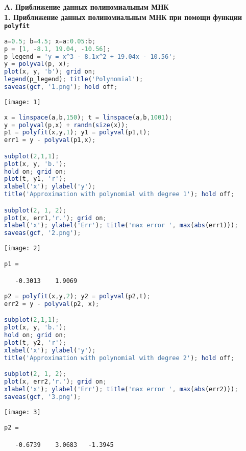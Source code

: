\documentclass[a4paper]{article}
\begin{document}

\newpage
{}
\setcounter{page}{2}

{\Large{\textbf{A. Приближение данных полиномиальным МНК}}}\\
{\textbf{1. Приближение данных полиномиальным МНК при помощи функции \texttt{polyfit}}}
\begin{lstlisting}[language=Octave]
a=0.5; b=4.5; x=a:0.05:b;
p = [1, -8.1, 19.04, -10.56];
p_legend = 'y = x^3 - 8.1x^2 + 19.04x - 10.56';
y = polyval(p, x);
plot(x, y, 'b'); grid on;
legend(p_legend); title('Polynomial');
saveas(gcf, '1.png'); hold off;
\end{lstlisting}
\begin{center}
    \texttt{[image: 1]}
\end{center}

\newpage
\begin{lstlisting}[language=Octave, firstnumber=8]
x = linspace(a,b,150); t = linspace(a,b,1001);
y = polyval(p,x) + randn(size(x));
p1 = polyfit(x,y,1); y1 = polyval(p1,t);
err1 = y - polyval(p1,x);

subplot(2,1,1);
plot(x, y, 'b.');
hold on; grid on;
plot(t, y1, 'r');
xlabel('x'); ylabel('y');
title('Approximation with polynomial with degree 1'); hold off;

subplot(2, 1, 2);
plot(x, err1,'r.'); grid on;
xlabel('x'); ylabel('Err'); title('max error ', max(abs(err1)));
saveas(gcf, '2.png');
\end{lstlisting}
\begin{center}
    \texttt{[image: 2]}
\end{center}
{\singlespacing
\begin{verbatim}
p1 =

   -0.3013    1.9069
\end{verbatim}}


\newpage
\begin{lstlisting}[language=Octave, firstnumber=24]
p2 = polyfit(x,y,2); y2 = polyval(p2,t);
err2 = y - polyval(p2, x);

subplot(2,1,1);
plot(x, y, 'b.');
hold on; grid on;
plot(t, y2, 'r');
xlabel('x'); ylabel('y');
title('Approximation with polynomial with degree 2'); hold off;

subplot(2, 1, 2);
plot(x, err2,'r.'); grid on;
xlabel('x'); ylabel('Err'); title('max error ', max(abs(err2)));
saveas(gcf, '3.png');
\end{lstlisting}
\begin{center}
    \texttt{[image: 3]}
\end{center}
{\singlespacing
\begin{verbatim}
p2 =

   -0.6739    3.0683   -1.3945
\end{verbatim}}
\end{document}

